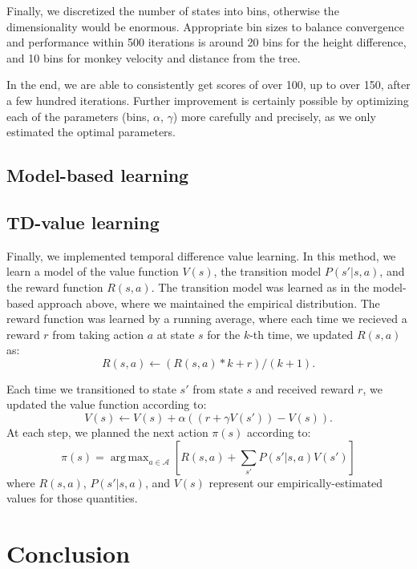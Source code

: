 \documentclass[11pt]{amsart}
\DeclareMathOperator*{\argmax}{arg\,max}
\begin{document}
Finally, we discretized the number of states into bins, otherwise the dimensionality would be enormous. Appropriate bin sizes to balance convergence and performance within 500 iterations is around 20 bins for the height difference, and 10 bins for monkey velocity and distance from the tree.

In the end, we are able to consistently get scores of over 100, up to over 150, after a few hundred iterations. Further improvement is certainly possible by optimizing each of the parameters (bins, $\alpha$, $\gamma$) more carefully and precisely, as we only estimated the optimal parameters.

\subsection{Model-based learning}

\subsection{TD-value learning}

Finally, we implemented temporal difference value learning. In this method, we learn a model of the value function $V(s)$, the transition model $P(s'|s,a)$, and the reward function $R(s,a)$. The transition model was learned as in the model-based approach above, where we maintained the empirical distribution. The reward function was learned by a running average, where each time we recieved a reward $r$ from taking action $a$ at state $s$ for the $k$-th time, we updated $R(s,a)$ as:
$$R(s,a) \gets (R(s,a) * k + r)/(k + 1).$$

Each time we transitioned to state $s'$ from state $s$ and received reward $r$, we updated the value function according to:
$$V(s) \gets V(s) + \alpha ((r + \gamma V(s')) - V(s)).$$
At each step, we planned the next action $\pi(s)$ according to:
$$\pi(s) = \argmax_{a \in \mathcal{A}} \left[ R(s,a) + \sum_{s'} P(s'|s,a) V(s') \right]$$
where $R(s,a)$, $P(s'|s,a)$, and $V(s)$ represent our empirically-estimated values for those quantities.

\section{Conclusion}


\begingroup
\begin{thebibliography}{9}


\end{thebibliography}
\endgroup
\end{document}
